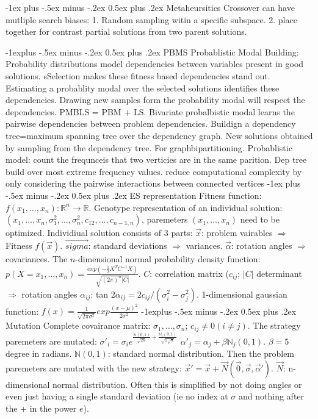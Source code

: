 \documentclass[10pt,landscape]{article}
\makeatletter
\renewcommand{\section}{\@startsection{section}{1}{0mm}%
                                {-1ex plus -.5ex minus -.2ex}%
                                {0.5ex plus .2ex}%
                                {\normalfont\large\bfseries}}
\renewcommand{\subsection}{\@startsection{subsection}{2}{0mm}%
                                {-1explus -.5ex minus -.2ex}%
                                {0.5ex plus .2ex}%
                                {\normalfont\normalsize\bfseries}}
\makeatother
\begin{document}
\begin{multicols}{3}
\section{Metaheursitics}
Crossover can have mutliple search biases:
1. Random sampling witin a specific subspace. 2. place together for contrast
partial solutions from two parent solutions.

\subsection{PBMS}
Probablistic Modal Building: Probability distributions model dependencies 
between variables present in good solutions. sSelection makes these fitness 
based dependencies stand out. Estimating a probablity modal over the selected
solutions identifies these dependencies. Drawing new samples form the probability
modal will respect the dependencies.
PMBLS = PBM + LS. Bivariate probalbistic modal learns the pairwise dependencies
between problem dependencies. Buildign a dependency tree=maximum spanning tree
over the dependency graph. New solutions obtained by sampling from the dependency
tree.
For graphbipartitioning. Probablistic model: count the frequnceis that two
verticies are in the same parition. Dep tree build over most extreme frequency
values. reduce computational complexity by only considering the
pairwise interactions between connected vertices
\section{ES representation}
Fitness function: $f(x_1,\dots,x_n):\mathbb{R}^n\to \mathbb{R}$.
Genotype representation of an individual solution:
$(x_1,\dots,x_n,\sigma^2_1,\dots,\sigma^2_n, c_{12},\dots,c_{n-1,n})$,
paremeters $(x_1, \dots,x_n)$ need to be optimized.
Individiual solution consists of 3 parts: $\vec{x}$: problem vairables
$\Rightarrow$ Fitness $f(\vec{x})$. $\vec{sigma}$: standard deviations
$\Rightarrow$ variances. $\vec{\alpha}$: rotation angles $\Rightarrow$
covariances. The $n$-dimensional normal probability density function:
$p(X=x_1,\dots,x_n)=\frac{exp(-\frac{1}{2}X^TC^{-1}X)}{\sqrt{(2\pi)^n|C|}}$.
$C$: correlation matrix ($c_{ij}$; $|C|$ determinant $\Rightarrow$ rotation 
angles $\alpha_{ij}$: tan $2\alpha_{ij}=2c_{ij}/(\sigma^2_i-\sigma^2_j)$.
1-dimensional gaussian function:
$f(x)=\frac{1}{\sqrt{2\pi \sigma^2}}exp\frac{(x-\mu)^2}{2\sigma^2}$
\subsection{Mutation}
Complete covairance matrix: $\sigma_1,\dots,\sigma_n$; $c_{ij}\neq 0 (i\neq j)$.
The strategy paremeters are mutated:
$\sigma'_i=\sigma_ie^{
	\frac{\mathbb{N}(0,1)}{\sqrt{2n}}+
	\frac{\mathbb{N}_i(0,1)}{\sqrt{2\sqrt{n}}}
}$
$\alpha'_j=\alpha_j+\beta\mathbb{N}_j(0,1)$.
$\beta = 5$ degree in radians. $\mathbb{N}(0,1)$: standard normal
distribution. Then the problem paremeters are mutated with the new
strategy: $\vec{x}'=\vec{x}+\vec{N}(\vec{0},\vec{\sigma},\vec{\alpha}')$.
$\vec{N}$: n-dimensional normal distribution.
Often this is simplified by not doing angles or even just having a single
standard deviation (ie no index at $\sigma$ and nothing after the + 
in the power $e$).

\end{multicols}
\end{document}
